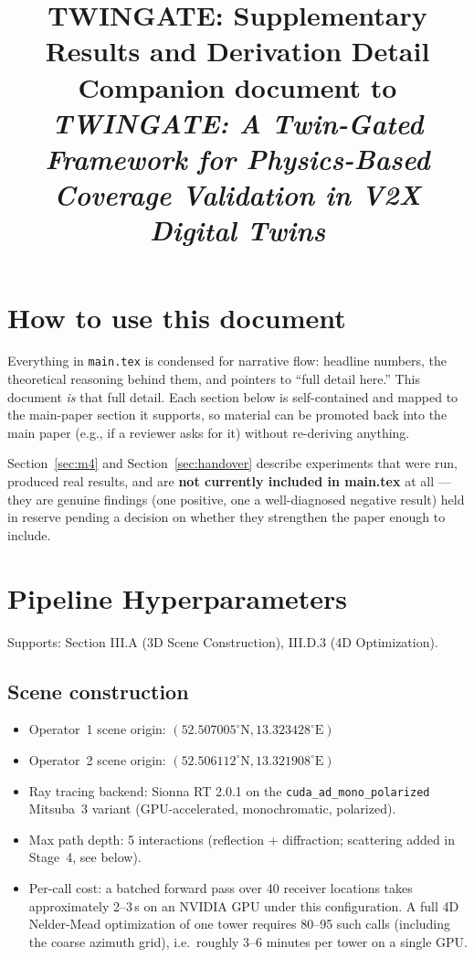 \documentclass[11pt]{article}
\title{TWINGATE: Supplementary Results and Derivation Detail\\[6pt]
\large Companion document to \emph{TWINGATE: A Twin-Gated Framework for
Physics-Based Coverage Validation in V2X Digital Twins}}
\author{}
\date{}
\begin{document}
\maketitle

\tableofcontents

\section{How to use this document}

Everything in \texttt{main.tex} is condensed for narrative flow: headline
numbers, the theoretical reasoning behind them, and pointers to ``full
detail here.'' This document \emph{is} that full detail. Each section
below is self-contained and mapped to the main-paper section it supports,
so material can be promoted back into the main paper (e.g., if a reviewer
asks for it) without re-deriving anything.

Section~\ref{sec:m4} and Section~\ref{sec:handover} describe experiments
that were run, produced real results, and are \textbf{not currently
included in main.tex} at all — they are genuine findings (one positive,
one a well-diagnosed negative result) held in reserve pending a decision
on whether they strengthen the paper enough to include.

\section{Pipeline Hyperparameters}
\label{sec:hyperparams}

Supports: Section III.A (3D Scene Construction), III.D.3 (4D Optimization).

\subsection{Scene construction}
\begin{itemize}
  \item Operator~1 scene origin: $(52.507005^\circ\text{N}, 13.323428^\circ\text{E})$
  \item Operator~2 scene origin: $(52.506112^\circ\text{N}, 13.321908^\circ\text{E})$
  \item Ray tracing backend: Sionna RT 2.0.1 on the \texttt{cuda\_ad\_mono\_polarized}
        Mitsuba~3 variant (GPU-accelerated, monochromatic, polarized).
  \item Max path depth: 5 interactions (reflection + diffraction; scattering
        added in Stage~4, see below).
  \item Per-call cost: a batched forward pass over 40 receiver locations
        takes approximately 2--3\,s on an NVIDIA GPU under this configuration.
        A full 4D Nelder-Mead optimization of one tower requires
        80--95 such calls (including the coarse azimuth grid), i.e.\
        roughly 3--6 minutes per tower on a single GPU.
\end{itemize}
\end{document}
